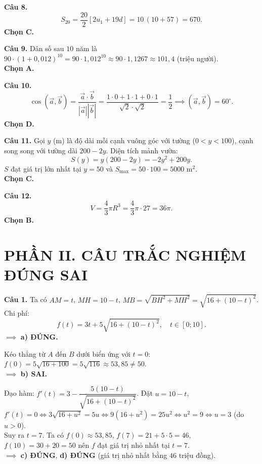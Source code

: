 \documentclass[12pt,a4paper]{article}
\begin{document}
\vspace{0.25cm}
\noindent\textbf{Câu 8.}
\[
S_{20} = \dfrac{20}{2}\left[2u_1 + 19d\right] = 10\,(10 + 57) = 670.
\]
\textbf{Chọn C.}

\vspace{0.25cm}
\noindent\textbf{Câu 9.} Dân số sau $10$ năm là $90\cdot (1 + 0{,}012)^{10} = 90\cdot 1{,}012^{10} \approx 90\cdot 1{,}1267 \approx 101{,}4$ (triệu người).\\
\textbf{Chọn A.}

\vspace{0.25cm}
\noindent\textbf{Câu 10.}
\[
\cos(\vec{a}, \vec{b}) = \dfrac{\vec{a}\cdot\vec{b}}{|\vec{a}||\vec{b}|} = \dfrac{1\cdot 0 + 1\cdot 1 + 0\cdot 1}{\sqrt{2}\cdot\sqrt{2}} = \dfrac{1}{2} \implies (\vec{a}, \vec{b}) = 60^\circ.
\]
\textbf{Chọn D.}

\vspace{0.25cm}
\noindent\textbf{Câu 11.} Gọi $y$ (m) là độ dài mỗi cạnh vuông góc với tường ($0 < y < 100$), cạnh song song với tường dài $200 - 2y$. Diện tích mảnh vườn:
\[
S(y) = y(200 - 2y) = -2y^2 + 200y.
\]
$S$ đạt giá trị lớn nhất tại $y = 50$ và $S_{\max} = 50\cdot 100 = 5000\text{ m}^2$.\\
\textbf{Chọn C.}

\vspace{0.25cm}
\noindent\textbf{Câu 12.}
\[
V = \dfrac{4}{3}\pi R^3 = \dfrac{4}{3}\pi\cdot 27 = 36\pi.
\]
\textbf{Chọn B.}

\vspace{0.4cm}
\section*{\large PHẦN II. CÂU TRẮC NGHIỆM ĐÚNG SAI}

\noindent\textbf{Câu 1.} Ta có $AM = t$, $MH = 10 - t$, $MB = \sqrt{BH^2 + MH^2} = \sqrt{16 + (10 - t)^2}$. Chi phí:
\[
f(t) = 3t + 5\sqrt{16 + (10 - t)^2}, \quad t \in [0; 10].
\]
$\implies$ \textbf{a) ĐÚNG.}

Kéo thẳng từ $A$ đến $B$ dưới biển ứng với $t = 0$: $f(0) = 5\sqrt{16 + 100} = 5\sqrt{116} \approx 53{,}85 \ne 50$.\\
$\implies$ \textbf{b) SAI.}

Đạo hàm: $f'(t) = 3 - \dfrac{5(10 - t)}{\sqrt{16 + (10 - t)^2}}$. Đặt $u = 10 - t$, $f'(t) = 0 \iff 3\sqrt{16 + u^2} = 5u \iff 9(16 + u^2) = 25u^2 \iff u^2 = 9 \iff u = 3$ (do $u > 0$).\\
Suy ra $t = 7$. Ta có $f(0) \approx 53{,}85$, $f(7) = 21 + 5\cdot 5 = 46$, $f(10) = 30 + 20 = 50$ nên $f$ đạt giá trị nhỏ nhất tại $t = 7$.\\
$\implies$ \textbf{c) ĐÚNG}, \textbf{d) ĐÚNG} (giá trị nhỏ nhất bằng $46$ triệu đồng).
\end{document}
